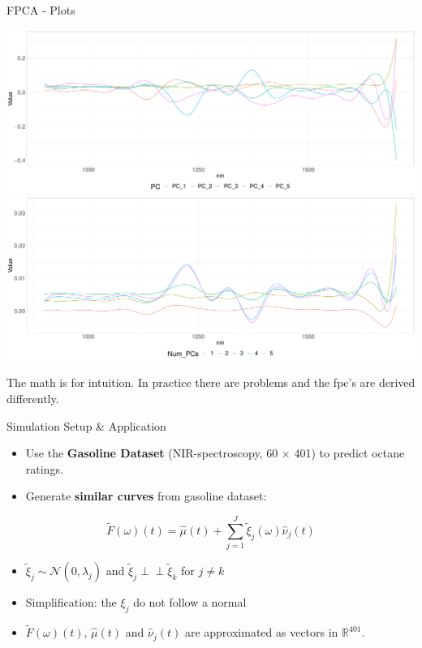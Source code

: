 \documentclass{beamer}
\newcommand{\independent}{\perp\!\!\!\!\perp}
\begin{document}
	\begin{frame}{FPCA - Plots}
		\begin{minipage}[c]{0.78\textwidth}
			\includegraphics[width = \textwidth]{../Graphics/principal_components.pdf}
			\includegraphics[width = \textwidth]{../Graphics/pc_approx.pdf}
		\end{minipage}
		\begin{minipage}[c]{0.19\textwidth}
			The math is for intuition. In practice there are problems and the fpc's are derived differently.
		\end{minipage}
	\end{frame}
	

	\begin{frame}{Simulation Setup \& Application}
		\begin{itemize}
			\item Use the \textbf{Gasoline Dataset} (NIR-spectroscopy, 60 $\times$ 401) to predict octane ratings.
			\item Generate \textbf{similar curves} from gasoline dataset:
		\end{itemize}
	
		$$\tilde{F}(\omega)(t) = \hat{\mu}(t) + \sum_{j = 1}^{J} \tilde{\xi}_j(\omega) \hat{\nu}_j(t)$$ 

		\begin{itemize}
			\item $\tilde{\xi}_{j} \sim \mathcal{N}(0,\hat{\lambda}_j)$ and $\tilde{\xi}_{j} \independent \tilde{\xi}_{k}$ for $j \neq k$
			\item Simplification: the $\xi_{j}$ do not follow a normal
			\item $\tilde{F}(\omega)(t)$, $\hat{\mu}(t)$ and $\hat{\nu}_j(t)$ are approximated as vectors in $\mathbb{R}^{401}$.
		\end{itemize}
		
	\end{frame}
	
\end{document}
